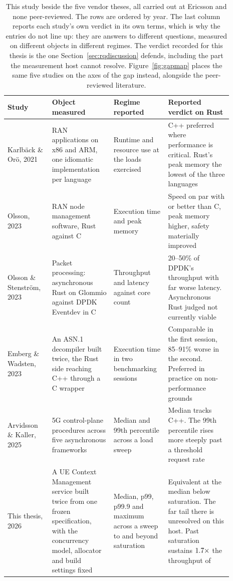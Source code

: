 \documentclass[english,oneside,a4paper,censored,csm,software-track-2020]{HYthesisML}
\renewcommand{\arraystretch}{0.95}
\begin{document}
\begin{table}[H]
\centering
\small
\caption[This study beside the five vendor theses]{This study beside the five vendor theses, all
carried out at Ericsson and none peer-reviewed. The rows are ordered by year. The last column
reports each study's own verdict in its own terms, which is why the entries do not line up: they
are answers to different questions, measured on different objects in different regimes. The
verdict recorded for this thesis is the one Section~\ref{sec:rqdiscussion} defends, including the
part the measurement host cannot resolve. Figure~\ref{fig:gapmap} places the same five studies on
the axes of the gap instead, alongside the peer-reviewed
literature.\label{tab:vendortheses}}
\renewcommand{\arraystretch}{1.2}
\begin{tabular}{@{}R{0.18\linewidth} R{0.25\linewidth} R{0.20\linewidth} R{0.26\linewidth}@{}}
\hline\hline
Study & Object measured & Regime reported & Reported verdict on Rust \\
\hline
Karlb\"ack \& Or\"o, 2021~\cite{karlback2021ran} &
RAN applications on x86 and ARM, one idiomatic implementation per language &
Runtime and resource use at the loads exercised &
C++ preferred where performance is critical. Rust's peak memory the lowest of the three
languages \\
Olsson, 2023~\cite{olsson2023ranmgmt} &
RAN node management software, Rust against C &
Execution time and peak memory &
Speed on par with or better than C, peak memory higher, safety materially improved \\
Olsson \& Stenstr\"om, 2023~\cite{olsson2023asyncpackets} &
Packet processing: asynchronous Rust on Glommio against DPDK Eventdev in C &
Throughput and latency against core count &
20--50\% of DPDK's throughput with far worse latency. Asynchronous Rust judged not currently
viable \\
Emberg \& Wadsten, 2023~\cite{emberg2023asn1} &
An {ASN.1} decompiler built twice, the Rust side reaching C++ through a C wrapper &
Execution time in two benchmarking sessions &
Comparable in the first session, 85--91\% worse in the second. Preferred in practice on
non-performance grounds \\
Arvidsson \& Kaller, 2025~\cite{arvidsson2025async} &
5G control-plane procedures across five asynchronous frameworks &
Median and 99th percentile across a load sweep &
Median tracks C++. The 99th percentile rises more steeply past a threshold request rate \\
\hline
This thesis, 2026 &
A UE Context Management service built twice from one frozen specification, with the concurrency
model, allocator and build settings fixed &
Median, p99, p99.9 and maximum across a sweep to and beyond saturation &
Equivalent at the median below saturation. The far tail there is unresolved on this host. Past
saturation \OverloadSustainedFaster{} sustains $1.7\times$ the throughput of
\OverloadSustainedSlower{} \\
\hline
\end{tabular}
\end{table}
\end{document}
